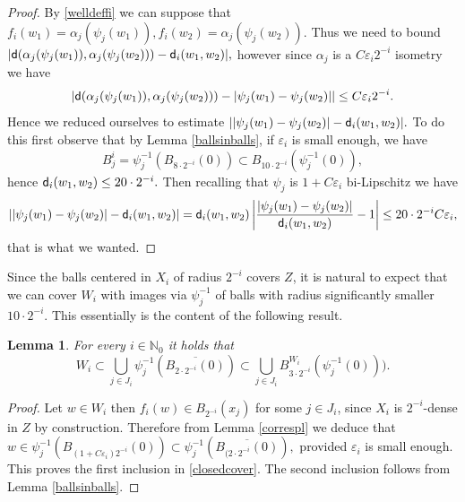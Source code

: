 \documentclass[11pt]{article}
\newcommand{\eps}{\varepsilon}
\newcommand{\sfd}{{\sf d}}
\theoremstyle{plain}
\newtheorem{lemma}[theorem]{Lemma}
\theoremstyle{definition}
\numberwithin{equation}{section}
\begin{document}
\begin{proof}
	By \eqref{welldeffi} we can suppose  that  $f_i(w_1)=\alpha_{j}(\psi_j(w_1)),f_i(w_2)=\alpha_{j}(\psi_j(w_2))$. Thus we need to bound $|\sfd(\alpha_{j}(\psi_j(w_1)),\alpha_{j}(\psi_j(w_2)))-\sfd_i(w_1,w_2)|,$ however since $\alpha_{j}$ is a $C\eps_i 2^{-i}$ isometry we have $$|\sfd(\alpha_{j}(\psi_j(w_1)),\alpha_{j}(\psi_j(w_2)))-|\psi_{j}(w_1)-\psi_{j}(w_2)||\le C\eps_i 2^{-i}.$$ Hence we reduced ourselves to estimate $||\psi_{j}(w_1)-\psi_{j}(w_2)|-\sfd_i(w_1,w_2)|.$ To do this first observe that by Lemma \ref{ballsinballs}, if $\eps_i$ is small enough, we have 
	$$ B_j^i=\psi_j^{-1}(B_{8\cdot 2^{-i}}(0))\subset B_{10\cdot 2^{-i}}(\psi_j^{-1}(0)),$$
	hence $\sfd_i(w_1,w_2)\le 20\cdot 2^{-i}.$ 
	Then recalling that $\psi_{j}$ is $1+C\eps_i$ bi-Lipschitz we have 
	\[||\psi_{j}(w_1)-\psi_{j}(w_2)|-\sfd_i(w_1,w_2)|=\sfd_i(w_1,w_2)\left| \frac{|\psi_{j}(w_1)-\psi_{j}(w_2)|}{\sfd_i(w_1,w_2)} -1 \right|\le 20\cdot 2^{-i} C\eps_i,  \]
	that is what we wanted.
	
\end{proof}

Since the balls centered in $X_i$ of radius $2^{-i}$ covers $Z$, it is natural to expect that we can cover $W_i$ with images via $\psi_j^{-1}$ of balls with radius significantly smaller ${10\cdot 2^{-i}}$. This essentially is the content of the following result. 
\begin{lemma}\label{completeness}
	For every $i \in \mathbb{N}_0$ it holds that
	\begin{equation}\label{closedcover}
		W_i\subset \bigcup_{j\in J_i} \psi_{j}^{-1}\left(\overline{B_{2\cdot 2^{-i}}(0)} \right )\subset \bigcup_{j\in J_i} {B^{W_i}_{3\cdot 2^{-i}}(\psi_{j}^{-1}(0))} ) .
	\end{equation} 
\end{lemma}
\begin{proof}
	Let $w \in W_i$ then $f_i(w)\in B_{ 2^{-i}}(x_j)$ for some $j \in J_i$, since $X_i$ is $2^{-i}$-dense in $Z$ by construction. Therefore from Lemma \ref{correspl} we deduce that $w \in \psi_j^{-1}(B_{(1+C\eps_i)2^{-i}}(0))\subset \psi_j^{-1}\left (\overline {B_{(2\cdot 2^{-i}}(0)}\right),$ provided $\eps_i$ is small enough. This proves the first inclusion in \eqref{closedcover}. The second inclusion follows from Lemma \ref{ballsinballs}. 
\end{proof}
\end{document}
